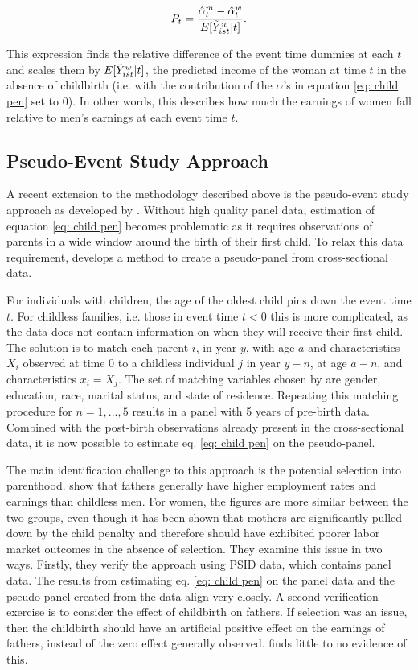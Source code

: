 \documentclass[10pt]{article}
\begin{document}
\begin{equation}
    P_t = \frac{\hat{\alpha}_t^m-\hat{\alpha}_t^w}{E[\Tilde{Y}^w_{ist}|t]}.
\end{equation}

This expression finds the relative difference of the event time dummies at each $t$ and scales them by $E[\Tilde{Y}^w_{ist}|t]$, the predicted income of the woman at time $t$ in the absence of childbirth (i.e. with the contribution of the $\alpha$'s in equation \ref{eq: child pen} set to 0). In other words, this describes how much the earnings of women fall relative to men's earnings at each event time $t$.

\subsection{Pseudo-Event Study Approach}
A recent extension to the methodology described above is the pseudo-event study approach as developed by \cite{kleven2022geography}. Without high quality panel data, estimation of equation \ref{eq: child pen} becomes problematic as it requires observations of parents in a wide window around the birth of their first child. To relax this data requirement, \cite{kleven2022geography} develops a method to create a pseudo-panel from cross-sectional data.

For individuals with children, the age of the oldest child pins down the event time $t$. For childless families, i.e. those in event time $t < 0$ this is more complicated, as the data does not contain information on when they will receive their first child. The solution is to match each parent $i$, in year $y$, with age $a$ and characteristics $X_i$ observed at time 0 to a childless individual $j$ in year $y-n$, at age $a-n$, and characteristics $x_i=X_j$. The set of matching variables chosen by \cite{kleven2022geography} are gender, education, race, marital status, and state of residence. Repeating this matching procedure for $n=1,...,5$ results in a panel with 5 years of pre-birth data. Combined with the post-birth observations already present in the cross-sectional data, it is now possible to estimate eq. \ref{eq: child pen} on the pseudo-panel.

The main identification challenge to this approach is the potential selection into parenthood. \cite{kleven2022geography} show that fathers generally have higher employment rates and earnings than childless men. For women, the figures are more similar between the two groups, even though it has been shown that mothers are significantly pulled down by the child penalty and therefore should have exhibited poorer labor market outcomes in the absence of selection. They examine this issue in two ways. Firstly, they verify the approach using PSID data, which contains panel data. The results from estimating eq. \ref{eq: child pen} on the panel data and the pseudo-panel created from the data align very closely. A second verification exercise is to consider the effect of childbirth on fathers. If selection was an issue, then the childbirth should have an artificial positive effect on the earnings of fathers, instead of the zero effect generally observed. \cite{kleven2019children} finds little to no evidence of this.
\end{document}
